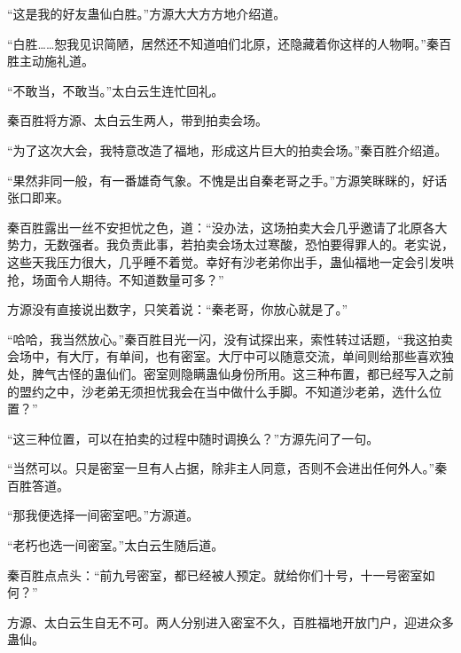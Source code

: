 \begin{this_body}
“这是我的好友蛊仙白胜。”方源大大方方地介绍道。

“白胜……恕我见识简陋，居然还不知道咱们北原，还隐藏着你这样的人物啊。”秦百胜主动施礼道。

“不敢当，不敢当。”太白云生连忙回礼。

秦百胜将方源、太白云生两人，带到拍卖会场。

“为了这次大会，我特意改造了福地，形成这片巨大的拍卖会场。”秦百胜介绍道。

“果然非同一般，有一番雄奇气象。不愧是出自秦老哥之手。”方源笑眯眯的，好话张口即来。

秦百胜露出一丝不安担忧之色，道：“没办法，这场拍卖大会几乎邀请了北原各大势力，无数强者。我负责此事，若拍卖会场太过寒酸，恐怕要得罪人的。老实说，这些天我压力很大，几乎睡不着觉。幸好有沙老弟你出手，蛊仙福地一定会引发哄抢，场面令人期待。不知道数量可多？”

方源没有直接说出数字，只笑着说：“秦老哥，你放心就是了。”

“哈哈，我当然放心。”秦百胜目光一闪，没有试探出来，索性转过话题，“我这拍卖会场中，有大厅，有单间，也有密室。大厅中可以随意交流，单间则给那些喜欢独处，脾气古怪的蛊仙们。密室则隐瞒蛊仙身份所用。这三种布置，都已经写入之前的盟约之中，沙老弟无须担忧我会在当中做什么手脚。不知道沙老弟，选什么位置？”

“这三种位置，可以在拍卖的过程中随时调换么？”方源先问了一句。

“当然可以。只是密室一旦有人占据，除非主人同意，否则不会进出任何外人。”秦百胜答道。

“那我便选择一间密室吧。”方源道。

“老朽也选一间密室。”太白云生随后道。

秦百胜点点头：“前九号密室，都已经被人预定。就给你们十号，十一号密室如何？”

方源、太白云生自无不可。两人分别进入密室不久，百胜福地开放门户，迎进众多蛊仙。

\end{this_body}

